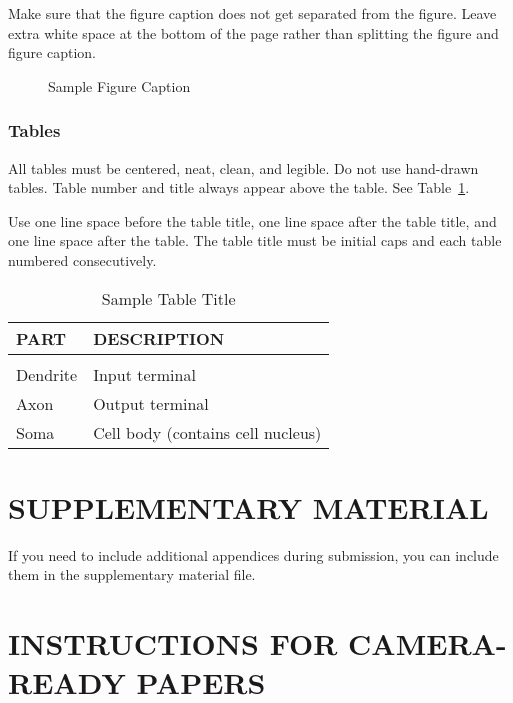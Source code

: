 \documentclass[twoside]{article} \usepackage{aistats2017}
\begin{document}
Make sure that the figure caption does not get separated from the
figure. Leave extra white space at the bottom of the page rather than
splitting the figure and figure caption.
\begin{figure}[h]
\vspace{.3in}
\centerline{}
\vspace{.3in}
\caption{Sample Figure Caption}
\end{figure}

\subsubsection{Tables}

All tables must be centered, neat, clean, and legible. Do not use hand-drawn tables. Table number and title always appear above the table.
See Table~\ref{sample-table}.

Use one line space before the table title, one line space after the table title, and one line space after the table. The table title must be
initial caps and each table numbered consecutively.

\begin{table}[h]
\caption{Sample Table Title} \label{sample-table}
\begin{center}
\begin{tabular}{ll}
{\bf PART}  &{\bf DESCRIPTION} \\
\hline \\
Dendrite         &Input terminal \\
Axon             &Output terminal \\
Soma             &Cell body (contains cell nucleus) \\
\end{tabular}
\end{center}
\end{table}

\section{SUPPLEMENTARY MATERIAL}

If you need to include additional appendices during submission, you
can include them in the supplementary material file.


\newpage

\section{INSTRUCTIONS FOR CAMERA-READY PAPERS}
\end{document}
